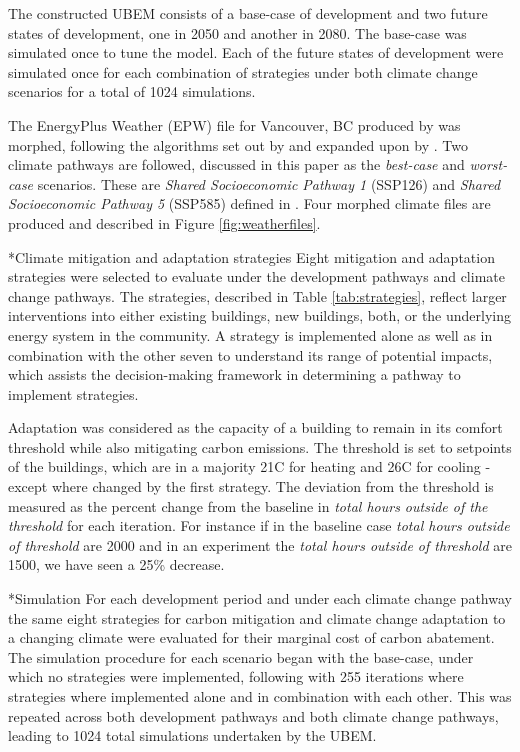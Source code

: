 \documentclass[twocolumn, a4paper,10pt]{article}
\makeatletter
\renewcommand\subsection{\@startsection{subsection}{1}{\z@}{\z@}{\z@}{\normalfont\normalsize\bfseries}}
\renewcommand\subsection{\@startsection{subsection}{1}{\z@}{\z@}{0.1pt}{\normalfont\normalsize\bfseries}}
\makeatother
\begin{document}
The constructed UBEM consists of a base-case of development and two future states of development, one in 2050 and another in 2080. The base-case was simulated once to tune the model. Each of the future states of development were simulated once for each combination of strategies under both climate change scenarios for a total of 1024 simulations.  

The EnergyPlus Weather (EPW) file for Vancouver, BC produced by \citet{cwec_2016} was morphed, following the algorithms set out by \citet{belcher_constructing_2005} and expanded upon by \citet{jentsch_climate_2008}. Two climate pathways are followed, discussed in this paper as the \textit{best-case} and \textit{worst-case} scenarios. These are \textit{Shared Socioeconomic Pathway 1} (SSP126) and \textit{Shared Socioeconomic Pathway 5} (SSP585)
defined in \citet{oneill_roads_2017}. Four morphed climate files are produced and described in Figure \ref{fig:weatherfiles}.



\subsection*{Climate mitigation and adaptation strategies}
Eight mitigation and adaptation strategies were selected to evaluate under the development pathways and climate change pathways. The strategies, described in Table \ref{tab:strategies}, reflect larger interventions into either existing buildings, new buildings, both, or the underlying energy system in the community. A strategy is implemented alone as well as in combination with the other seven to understand its range of potential impacts, which assists the decision-making framework in determining a pathway to implement strategies.

Adaptation was considered as the capacity of a building to remain in its comfort threshold while also mitigating carbon emissions. The threshold is set to setpoints of the buildings, which are in a majority 21C for heating and 26C for cooling - except where changed by the first strategy. The deviation from the threshold is measured as the percent change from the baseline in \textit{total hours outside of the threshold} for each iteration. For instance if in the baseline case \textit{total hours outside of threshold} are 2000 and in an experiment the \textit{total hours outside of threshold} are 1500, we have seen a 25\% decrease. 


\subsection*{Simulation}
For each development period and under each climate change pathway the same eight strategies for carbon mitigation and climate change adaptation to a changing climate were evaluated for their marginal cost of carbon abatement. The simulation procedure for each scenario began with the base-case, under which no strategies were implemented, following with 255 iterations where strategies where implemented alone and in combination with each other. This was repeated across both development pathways and both climate change pathways, leading to 1024 total simulations undertaken by the UBEM.
\end{document}
